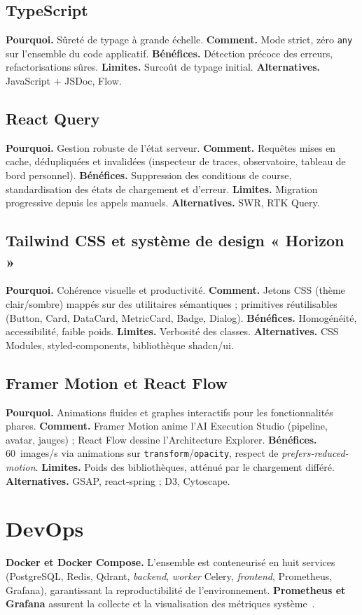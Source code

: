 \subsection{TypeScript}
\textbf{Pourquoi.} Sûreté de typage à grande échelle. \textbf{Comment.} Mode
strict, zéro \texttt{any} sur l'ensemble du code applicatif. \textbf{Bénéfices.}
Détection précoce des erreurs, refactorisations sûres. \textbf{Limites.} Surcoût
de typage initial. \textbf{Alternatives.} JavaScript + JSDoc, Flow.

\subsection{React Query}
\textbf{Pourquoi.} Gestion robuste de l'état serveur. \textbf{Comment.} Requêtes
mises en cache, dédupliquées et invalidées (inspecteur de traces, observatoire,
tableau de bord personnel). \textbf{Bénéfices.} Suppression des conditions de
course, standardisation des états de chargement et d'erreur. \textbf{Limites.}
Migration progressive depuis les appels manuels. \textbf{Alternatives.} SWR,
RTK Query.

\subsection{Tailwind CSS et système de design « Horizon »}
\textbf{Pourquoi.} Cohérence visuelle et productivité. \textbf{Comment.} Jetons CSS
(thème clair/sombre) mappés sur des utilitaires sémantiques ; primitives
réutilisables (Button, Card, DataCard, MetricCard, Badge, Dialog). \textbf{Bénéfices.}
Homogénéité, accessibilité, faible poids. \textbf{Limites.} Verbosité des classes.
\textbf{Alternatives.} CSS Modules, styled-components, bibliothèque shadcn/ui.

\subsection{Framer Motion et React Flow}
\textbf{Pourquoi.} Animations fluides et graphes interactifs pour les
fonctionnalités phares. \textbf{Comment.} Framer Motion anime l'AI Execution
Studio (pipeline, avatar, jauges) ; React Flow dessine l'Architecture Explorer.
\textbf{Bénéfices.} 60~images/s via animations sur \texttt{transform}/\texttt{opacity},
respect de \emph{prefers-reduced-motion}. \textbf{Limites.} Poids des
bibliothèques, atténué par le chargement différé. \textbf{Alternatives.} GSAP,
react-spring ; D3, Cytoscape.

\section{DevOps}
\textbf{Docker et Docker Compose.} L'ensemble est conteneurisé en huit services
(PostgreSQL, Redis, Qdrant, \emph{backend}, \emph{worker} Celery, \emph{frontend},
Prometheus, Grafana), garantissant la reproductibilité de l'environnement.
\textbf{Prometheus et Grafana} assurent la collecte et la visualisation des
métriques système~\cite{docker}.

